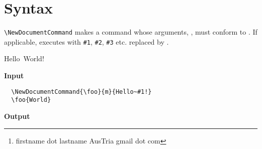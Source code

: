 \documentclass{l3doc}
\author{Erwann Rogard\thanks{firstname dot lastname AusTria gmail dot com}}
\begin{document}
\maketitle



\section*{Syntax}

\noindent\verb|\NewDocumentCommand| 
makes  a command whose arguments, , must conform to . 
If applicable,  executes  with \verb|#1|, \verb|#2|, \verb|#3| etc. 
replaced by .


\begin{table}[htp]
\caption{Hello~World!}\label{xparse:helloworld}
\textbf{Input}%
\begin{verbatim}
  \NewDocumentCommand{\foo}{m}{Hello~#1!}
  \foo{World}
\end{verbatim}
\textbf{Output}\\
\end{table}
\end{document}
